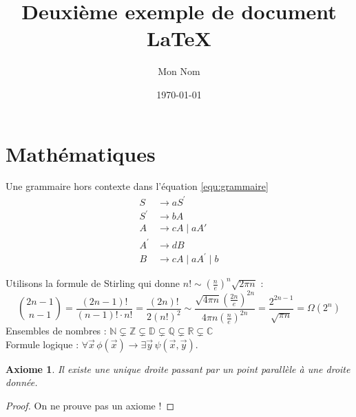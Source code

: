 \documentclass{scrartcl}
\title{\textbf{Deuxième exemple de document \LaTeX}}
\author{Mon Nom}
\date{\today}
\newtheorem{axiom}{Axiome}
\begin{document}
\maketitle

\section{Mathématiques}
    Une grammaire hors contexte dans l'équation \eqref{equ:grammaire}
    \begin{equation}
        \label{equ:grammaire}
        \begin{aligned}
            S &\rightarrow aS^{'} \\
            S^{'} & \rightarrow bA\\
            A & \rightarrow cA \mid aA' \\
            A^{'} & \rightarrow dB\\
            B & \rightarrow cA \mid aA^{'} \mid b
        \end{aligned}
    \end{equation}

    Utilisons la formule de Stirling qui donne $n! \sim \left(\frac{n}{e}\right)^n \sqrt{2\pi n}$ : 
    \[
    \binom{2n-1}{n-1} = \frac{(2n-1)!}{(n-1)! \cdot n!} = \frac{(2n)!}{2(n!)^2} \sim \frac{\sqrt{4\pi n}\left(\frac{2n}{e}\right)^{2n}}{4\pi n\left(\frac{n}{e}\right)^{2n}} = \frac{2^{2n-1}}{\sqrt{\pi n}} = \Omega(2^n)
    \]
    Ensembles de nombres : $\mathbb{N} \subsetneq \mathbb{Z} \subsetneq \mathbb{D} \subsetneq \mathbb{Q} \subsetneq \mathbb{R} \subsetneq \mathbb{C}$\\
    Formule logique : $\forall \vec{x}\,\phi(\vec{x}) \rightarrow \exists \vec{y}\,\psi(\vec{x}, \vec{y})$.

    \begin{axiom}
        Il existe une unique droite passant par un point parallèle à une droite donnée.
    \end{axiom}
    \begin{proof}
        On ne prouve pas un axiome !
    \end{proof}
\end{document}
